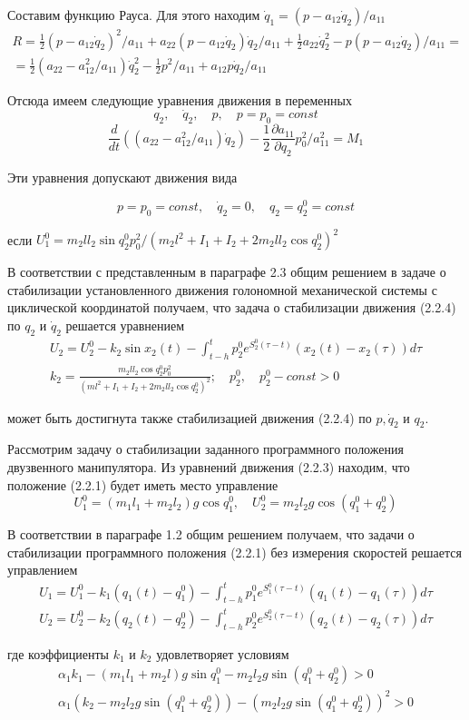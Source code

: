 Составим функцию Рауса. Для этого находим $\dot q_1 = (p - a_12 \dot q_2) / a_{11}$
$$
\begin{array}{c}
\displaystyle R = \frac12 (p - a_{12} \dot q_2)^2 / a_{11} + a_{22} (p - a_{12} \dot q_2) \dot q_2 / a_{11} + \frac12 a_{22} \dot q_2^2 - p (p - a_{12} \dot q_2) / a_{11} =\\
\displaystyle = \frac12 (a_22 - a_{12}^2 / a_{11}) \dot q_2^2 - \frac12 p^2 / a_{11} + a_{12} p \dot q_2 / a_{11}
\end{array}
$$

Отсюда имеем следующие уравнения движения в переменных $$q_2, \quad \dot q_2, \quad p, \quad p = p_0 = const$$
$$\frac{d}{dt} ((a_{22} - a_{12}^2 / a_{11}) \dot q_2) - \frac12 \frac{\partial a_{11}}{\partial q_2} p_0^2 / a_{11}^2 = M_1$$


Эти уравнения допускают движения вида 

\begin{equation}
p = p_0 = const, \quad \dot q_2 = 0, \quad q_2 = q_2^0 = const
\end{equation}

если $U_1^0 = m_2 l l_2 \sin q_2^0 p_0^2 / (m_2 l^2 + I_1 + I_2 + 2 m_2 l l_2 \cos q_2^0)^2$

В соответствии с представленным в параграфе 2.3 общим решением в задаче о стабилизации установленного движения голономной механической системы с циклической координатой получаем, что задача о стабилизации движения (2.2.4) по $q_2$ и $\dot q_2$ решается уравнением
$$
\begin{array}{c}
\displaystyle U_2 = U_2^0 - k_2 \sin x_2 (t) - \int_{t-h}^{t} p_2^0 e^{S_2^0 (\tau - t)} (x_2 (t) - x_2 (\tau)) d \tau\\
\displaystyle k_2 = \frac{m_2 l l_2 \cos q_2^0 p_0^2}{(m l^2 + I_1 + I_2 + 2 m_2 l l_2 \cos q_2^0)^2}; \quad p_2^0, \quad p_2^0 - const > 0
\end{array}
$$

может быть достигнута также стабилизацией движения (2.2.4) по $p, \dot q_2$ и $q_2.$

Рассмотрим задачу о стабилизации заданного программного положения двузвенного манипулятора. Из уравнений движения (2.2.3) находим, что положение (2.2.1) будет иметь место управление $$U_1^0 = (m_1 l_1 + m_2 l_2) g \cos q_1^0, \quad U_2^0 = m_2 l_2 g \cos (q_1^0 + q_2^0)$$

В соответствии в параграфе 1.2 общим решением получаем, что задачи о стабилизации программного положения (2.2.1) без измерения скоростей решается управлением 
$$
\begin{array}{l}
\displaystyle U_1 = U_1^0 - k_1 (q_1(t) - q_1^0) - \int_{t-h}^{t} p_1^0 e^{S_1^0 (\tau - t)} (q_1(t) - q_1(\tau)) d \tau\\
\displaystyle U_2 = U_2^0 - k_2 (q_2(t) - q_2^0) - \int_{t-h}^{t} p_2^0 e^{S_2^0 (\tau - t)} (q_2(t) - q_2(\tau)) d \tau
\end{array}
$$

где коэффициенты $k_1$ и $k_2$ удовлетворяет условиям 
$$
\begin{array}{c}
\alpha_1 k_1 - (m_1 l_1 + m_2 l) g \sin q_1^0 - m_2 l_2 g \sin (q_1^0 + q_2^0) > 0\\
\alpha_1 (k_2 - m_2 l_2 g \sin (q_1^0 + q_2^0)) - (m_2 l_2 g \sin (q_1^0 + q_2^0))^2 > 0
\end{array}
$$